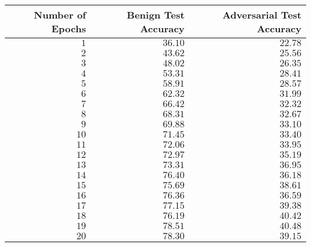 \documentclass[11pt, reqno]{amsart}
\begin{document}
\newpage


\begin{table}[h]
    \centering
    \begin{tabular}{| r | r | r |}
      \bottomrule
      \textbf{Number of Epochs}   & \textbf{Benign Test Accuracy}  & \textbf{Adversarial Test Accuracy} \\   
      \midrule
      $1$                         & $36.10$                 & $22.78$ \\
      $2$                         & $43.62$                 & $25.56$ \\
      $3$                         & $48.02$                 & $26.35$ \\
      $4$                         & $53.31$                 & $28.41$ \\
      $5$                         & $58.91$                 & $28.57$ \\
      $6$                         & $62.32$                 & $31.99$ \\
      $7$                         & $66.42$                 & $32.32$ \\
      $8$                         & $68.31$                 & $32.67$ \\
      $9$                         & $69.88$                 & $33.10$ \\
      $10$                        & $71.45$                 & $33.40$ \\
      $11$                        & $72.06$                 & $33.95$ \\
      $12$                        & $72.97$                 & $35.19$ \\
      $13$                        & $73.31$                 & $36.95$ \\
      $14$                        & $76.40$                 & $36.18$ \\
      $15$                        & $75.69$                 & $38.61$ \\
      $16$                        & $76.36$                 & $36.59$ \\
      $17$                        & $77.15$                 & $39.38$ \\
      $18$                        & $76.19$                 & $40.42$ \\
      $19$                        & $78.51$                 & $40.48$ \\
      $20$                        & $78.30$                 & $39.15$ \\

\end{tabular}
\end{table}
\end{document}
